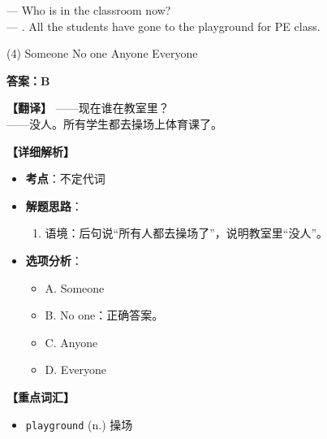 \documentclass[11pt, a4paper]{article}
\newcommand{\analysis}[4]{
    \begin{solutionbox}
        \textbf{答案：#1}
        
        \textbf{【翻译】} #2
        
        \textbf{【详细解析】}
        #3
        
        \textbf{【重点词汇】}
        #4
    \end{solutionbox}
}
\newcommand{\blank}{\underline{\hspace{1.5cm}}}
\begin{document}
\begin{questions}
    \item --- Who is in the classroom now? \\
    --- \blank. All the students have gone to the playground for PE class.
    \begin{tasks}(4)
        \task Someone \task No one \task Anyone \task Everyone
    \end{tasks}
    \analysis{B}{——现在谁在教室里？\\——没人。所有学生都去操场上体育课了。}{
        \begin{itemize}
            \item \textbf{考点}：不定代词
            \item \textbf{解题思路}：
                \begin{enumerate}
                    \item 语境：后句说“所有人都去操场了”，说明教室里“没人”。
                \end{enumerate}
            \item \textbf{选项分析}：
                \begin{itemize}
                    \item A. Someone
                    \item B. No one：正确答案。
                    \item C. Anyone
                    \item D. Everyone
                \end{itemize}
        \end{itemize}
    }{
        \begin{itemize}
            \item \texttt{playground} (n.) 操场
        \end{itemize}
    }


\end{questions}
\end{document}
